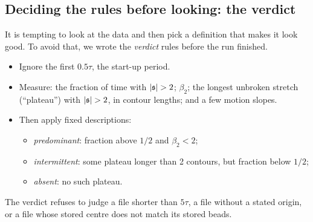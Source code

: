 \documentclass[11pt]{article}
\begin{document}
\subsection{Deciding the rules before looking: the verdict}\label{sec:b-verdict}
It is tempting to look at the data and then pick a definition that makes it look good. To avoid that, we wrote the \emph{verdict} rules before the run finished.
\begin{itemize}
\item Ignore the first $0.5\tau$, the start-up period.
\item Measure: the fraction of time with $|\spn|>2$; $\beta_2$; the longest unbroken stretch (``plateau'') with $|\spn|>2$, in contour lengths; and a few motion slopes.
\item Then apply fixed descriptions:
\begin{itemize}
\item \emph{predominant}: fraction above $1/2$ and $\beta_2<2$;
\item \emph{intermittent}: some plateau longer than 2 contours, but fraction below $1/2$;
\item \emph{absent}: no such plateau.
\end{itemize}
\end{itemize}
The verdict refuses to judge a file shorter than $5\tau$, a file without a stated origin, or a file whose stored centre does not match its stored beads.


\end{document}
